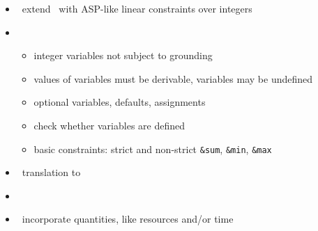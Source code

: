 \begin{frame}{\fclingo}
  \begin{itemize}
  \item {} \ extend \clingo\ with ASP-like linear constraints over integers
  \item {} \
    \begin{itemize}
    \item integer variables not subject to grounding
    \item values of variables must be derivable, variables may be undefined
    \item optional variables, defaults, assignments
    \item check whether variables are defined
    \item basic constraints: strict and non-strict \lstinline{&sum}, \lstinline{&min}, \lstinline{&max}
    \end{itemize}
  \item {} \ translation to \clingcon
  \item {} \ \cite{cafascwa20a,cafascwa20b}
  \item {} \ incorporate quantities, like resources and/or time
  \end{itemize}
\end{frame}
%
